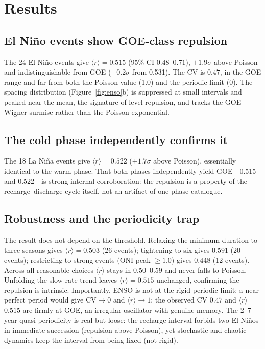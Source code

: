 \documentclass[12pt,a4paper]{article}
\begin{document}
\section{Results}
\subsection{El Ni\~no events show GOE-class repulsion}
The 24 El Ni\~no events give $\langle r\rangle = 0.515$ (95\% CI $0.48$--$0.71$), $+1.9\sigma$ above Poisson and indistinguishable from GOE ($-0.2\sigma$ from 0.531). The CV is $0.47$, in the GOE range and far from both the Poisson value (1.0) and the periodic limit (0). The spacing distribution (Figure~\ref{fig:enso}b) is suppressed at small intervals and peaked near the mean, the signature of level repulsion, and tracks the GOE Wigner surmise rather than the Poisson exponential.

\subsection{The cold phase independently confirms it}
The 18 La Ni\~na events give $\langle r\rangle = 0.522$ ($+1.7\sigma$ above Poisson), essentially identical to the warm phase. That both phases independently yield GOE---0.515 and 0.522---is strong internal corroboration: the repulsion is a property of the recharge--discharge cycle itself, not an artifact of one phase catalogue.

\subsection{Robustness and the periodicity trap}
The result does not depend on the threshold. Relaxing the minimum duration to three seasons gives $\langle r\rangle=0.503$ (26 events); tightening to six gives $0.591$ (20 events); restricting to strong events (ONI peak $\ge1.0$) gives $0.448$ (12 events). Across all reasonable choices $\langle r\rangle$ stays in $0.50$--$0.59$ and never falls to Poisson. Unfolding the slow rate trend leaves $\langle r\rangle=0.515$ unchanged, confirming the repulsion is intrinsic. Importantly, ENSO is not at the rigid periodic limit: a near-perfect period would give $\mathrm{CV}\to0$ and $\langle r\rangle\to1$; the observed CV $0.47$ and $\langle r\rangle$ $0.515$ are firmly at GOE, an irregular oscillator with genuine memory. The 2--7 year quasi-periodicity is real but loose: the recharge interval forbids two El Ni\~nos in immediate succession (repulsion above Poisson), yet stochastic and chaotic dynamics keep the interval from being fixed (not rigid).
\end{document}
